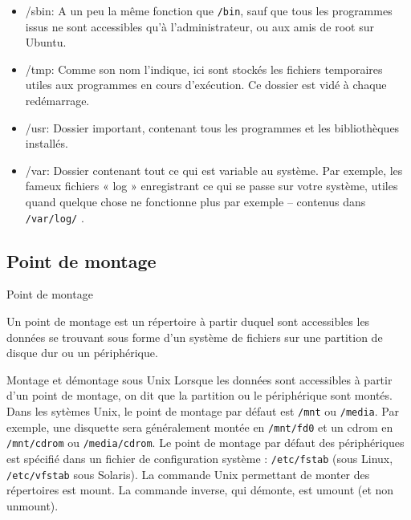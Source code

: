 \documentclass[10pt]{beamer}
\begin{document}
\begin{frame}
\begin{itemize}
\item \alert{/sbin}: A un peu la même fonction que \texttt{/bin}, sauf que tous les programmes
issus ne sont accessibles qu'à l'administrateur, ou aux amis de root sur
Ubuntu.
\item \alert{/tmp}: Comme son nom l'indique, ici sont stockés les fichiers temporaires
utiles aux programmes en cours d'exécution. Ce dossier est vidé à chaque
redémarrage.
\item \alert{/usr}: Dossier important, contenant tous les programmes et les bibliothèques installés.
\item \alert{/var}: Dossier contenant tout ce qui est variable au système. Par exemple,
les fameux fichiers « log » enregistrant ce qui se passe sur votre système,
utiles quand quelque chose ne fonctionne plus par exemple – contenus
dans \texttt{/var/log/} .
\end{itemize}
\end{frame}
\subsection{Point de montage}
\begin{frame}{Point de montage}

	Un point de montage est un répertoire à partir duquel sont accessibles les données se trouvant sous forme d'un système de fichiers sur une partition de disque dur ou un périphérique. 

\begin{alertblock}{Montage et démontage sous Unix}
Lorsque les données sont accessibles à partir d'un point de montage, on dit que la
partition ou le périphérique  sont montés. Dans les sytèmes Unix, le point de
montage   par   défaut   est   \texttt{/mnt}   ou   \texttt{/media}.   Par   exemple,   une   disquette   sera
généralement montée en \texttt{/mnt/fd0} et un cdrom en \texttt{/mnt/cdrom} ou \texttt{/media/cdrom}.
Le point de montage par défaut des périphériques est spécifié dans un fichier de
configuration   système   :   \texttt{/etc/fstab}   (sous   Linux,   \texttt{/etc/vfstab}   sous   Solaris).   La commande Unix permettant de monter des répertoires est \alert{mount}. La commande
inverse, qui démonte, est \alert{umount} (et non unmount).
\end{alertblock}
\end{frame}
\end{document}
